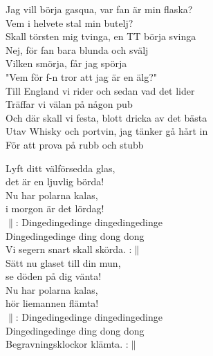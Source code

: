 \documentclass[a6paper, 10pt, twoside]{article}
\begin{document}
\noindent
{}
\small
\begin{center}
\end{center}
\begin{lyrics}
Jag vill börja gasqua, var fan är min flaska?\\
Vem i helvete stal min butelj?\\
Skall törsten mig tvinga, en TT börja svinga\\
Nej, för fan bara blunda och svälj\\
Vilken smörja, får jag spörja\\
"Vem för f-n tror att jag är en älg?"\\
 \newline
Till England vi rider och sedan vad det lider\\
Träffar vi välan på någon pub\\
Och där skall vi festa, blott dricka av det bästa\\
Utav Whisky och portvin, jag tänker gå hårt in\\
För att prova på rubb och stubb
\end{lyrics}
%

\begin{center}
\end{center}
\begin{lyrics}
Lyft ditt välförsedda glas, \\
det är en ljuvlig börda! \\
Nu har polarna kalas, \\
i morgon är det lördag! \\
$\|$: Dingedingedinge dingedingedinge \\
Dingedingedinge ding dong dong \\
Vi segern snart skall skörda. :$\|$ \\
\newline
Sätt nu glaset till din mun, \\
se döden på dig vänta! \\
Nu har polarna kalas, \\
hör liemannen flämta! \\
$\|$: Dingedingedinge dingedingedinge \\
Dingedingedinge ding dong dong \\
Begravningsklockor klämta. :$\|$
\end{lyrics}
\end{document}
